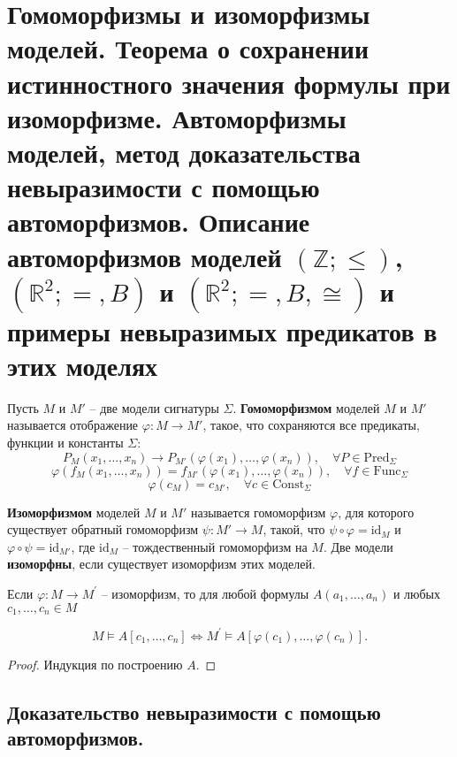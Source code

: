 \section{Гомоморфизмы и изоморфизмы моделей. Теорема о сохранении истинностного значения формулы при изоморфизме.
Автоморфизмы моделей, метод доказательства невыразимости с помощью автоморфизмов. Описание автоморфизмов моделей
$(\mathbb Z;\leqslant)$, $(\mathbb R^2;=,B)$ и $(\mathbb R^2;=,B,\cong)$ и примеры невыразимых предикатов в этих
моделях}
\begin{definition}
	Пусть $M$ и $M'$ -- две модели сигнатуры $\Sigma$. \textbf{Гомоморфизмом} моделей $M$ и $M'$ называется
	отображение $\varphi\colon M\to M'$, такое, что сохраняются все предикаты, функции и константы $\Sigma$:
	$$
		P_M(x_1,\ldots,x_n) \rightarrow P_{M'}(\varphi(x_1),\ldots,\varphi(x_n)),\quad\forall P\in
		\mathrm{Pred}_\Sigma
	$$
	$$
		\varphi(f_M(x_1,\ldots,x_n)) = f_{M'}(\varphi(x_1),\ldots,\varphi(x_n)),\quad\forall f\in\mathrm{Func}_\Sigma
	$$
	$$
		\varphi(c_M) = c_{M'},\quad\forall c\in\mathrm{Const}_\Sigma
	$$
\end{definition}
\begin{definition}
	\textbf{Изоморфизмом} моделей $M$ и $M'$ называется гомоморфизм $\varphi$, для которого существует обратный
	гомоморфизм $\psi\colon M'\to M$, такой, что $\psi\circ\varphi=\mathrm{id}_M$ и $\varphi\circ\psi =
	\mathrm{id}_{M'}$, где
	$\mathrm{id}_M$ -- тождественный гомоморфизм на $M$.
	Две модели \textbf{изоморфны}, если существует изоморфизм этих моделей.
\end{definition}

\begin{theorem}
Если $\varphi: M \rightarrow M^{\prime}$ -- изоморфизм, то для любой формулы $A\left(a_{1}, \ldots, a_{n}\right)$ и
	любых $c_{1}, \ldots, c_{n} \in M$

$$M \vDash A\left[c_{1}, \ldots, c_{n}\right] \Longleftrightarrow M^{\prime} \vDash
	A\left[\varphi\left(c_{1}\right), \ldots, \varphi\left(c_{n}\right)\right].$$
\end{theorem}

\begin{proof}
Индукция по построению $A$.
\end{proof}

\subsection{Доказательство невыразимости с помощью автоморфизмов.}

